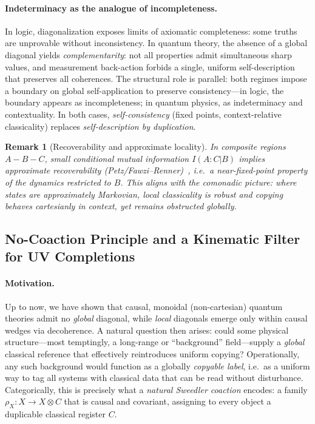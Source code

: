 \documentclass[11pt]{article}
\theoremstyle{upright}
\newtheorem{remark}{Remark}
\begin{document}
\paragraph{Indeterminacy as the analogue of incompleteness.}
In logic, diagonalization exposes limits of axiomatic completeness: some truths are unprovable without inconsistency. In quantum theory, the absence of a global diagonal yields \emph{complementarity}: not all properties admit simultaneous sharp values, and measurement back-action forbids a single, uniform self-description that preserves all coherences. The structural role is parallel: both regimes impose a boundary on global self-application to preserve consistency---in logic, the boundary appears as incompleteness; in quantum physics, as indeterminacy and contextuality. In both cases, \emph{self-consistency} (fixed points, context-relative classicality) replaces \emph{self-description by duplication}.

\begin{remark}[Recoverability and approximate locality]
In composite regions $A\!-\!B\!-\!C$, small conditional mutual information $I(A\!:\!C|B)$ implies approximate recoverability (Petz/Fawzi--Renner)~\cite{Petz1986,FawziRenner2015}, i.e.\ a near-fixed-point property of the dynamics restricted to $B$. This aligns with the comonadic picture: where states are approximately Markovian, local classicality is robust and copying behaves cartesianly \emph{in context}, yet remains obstructed globally.
\end{remark}

\subsection{No-Coaction Principle and a Kinematic Filter for UV Completions}
\label{sec:no-coaction-uv-filter}

\paragraph{Motivation.}
Up to now, we have shown that causal, monoidal (non-cartesian) quantum theories admit no \emph{global} diagonal, while \emph{local} diagonals emerge only within causal wedges via decoherence. A natural question then arises: could some physical structure—most temptingly, a long-range or “background” field—supply a \emph{global} classical reference that effectively reintroduces uniform copying? Operationally, any such background would function as a globally \emph{copyable label}, i.e.\ as a uniform way to tag all systems with classical data that can be read without disturbance. Categorically, this is precisely what a \emph{natural Sweedler coaction} encodes: a family $\rho_X:X\!\to\!X\!\otimes\!C$ that is causal and covariant, assigning to every object a duplicable classical register $C$.
\end{document}
